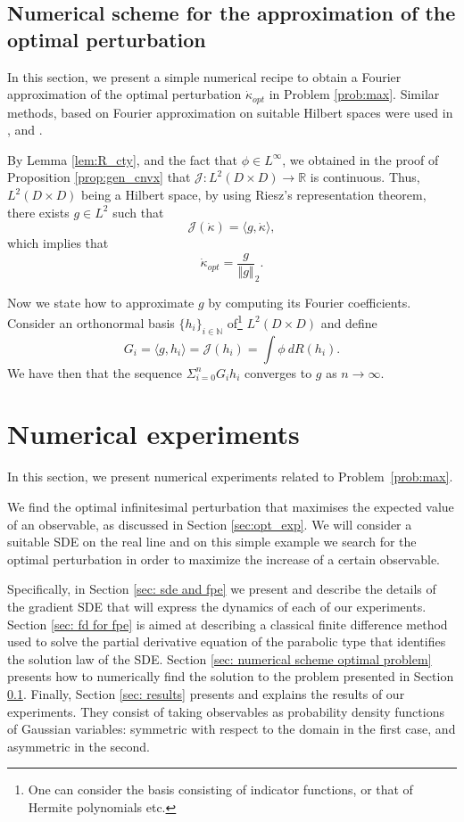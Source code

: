 \documentclass{amsart}
\newcommand\bN{{\mathbb N}}
\newcommand{\norm}[1]{\left\Vert#1\right\Vert}
\begin{document}
\subsection{Numerical scheme for the approximation of the optimal perturbation}
\label{sec: numerical scheme for the approximation of the opt. pertb.}
In this section, we present a simple numerical recipe to obtain a Fourier approximation of the optimal perturbation $\dot{\kappa}_{opt}$ in Problem \ref{prob:max}. Similar methods, based on  Fourier approximation on suitable Hilbert spaces  were used in \cite{FG23}, and \cite{GN25}.
 
 By Lemma \ref{lem:R_cty}, and the fact that $\phi\in L^\infty$, we obtained in the proof of Proposition \ref{prop:gen_cnvx} that $\mathcal J:L^2(D\times D)\to \mathbb{R}$ is continuous. 
 Thus, $L^2(D\times D)$ being a Hilbert space, by  using Riesz's representation theorem, there exists \(g\in L^2\) such that 
\[
\mathcal{J}(\dot{\kappa})= \langle g, \dot{\kappa} \rangle,
\]
which implies that 
\[
\dot{\kappa}_{opt}=\frac{g}{\norm{g}}_{2}.
\]

Now we state how to approximate \(g\) by computing its Fourier coefficients. Consider an orthonormal basis
\(\{h_i\}_{i\in \bN}\) of\footnote{One can consider the basis consisting of indicator functions, or that of Hermite polynomials etc.} \(L^2(D\times D)\) and define
\[
G_i = \langle g, h_i \rangle = \mathcal{J}(h_i) = \int \phi~dR(h_i).
\]
 We have then that the sequence \(\Sigma_{i=0}^n G_ih_i\) converges to \(g\) as \(n\to\infty\).\\

\section{Numerical experiments}\label{sec:numerics}
In this section, we present numerical experiments related to Problem~\ref{prob:max}.

We find the optimal infinitesimal perturbation that maximises the expected value of an observable, as discussed in Section \ref{sec:opt_exp}. 
We will consider a suitable SDE on the real line and on this simple example we  search for the optimal perturbation in order to maximize the increase of a certain observable.

Specifically, in Section \ref{sec: sde and fpe} we present and describe the details of the gradient SDE that will express the dynamics of each of our experiments. Section \ref{sec: fd for fpe} is aimed at describing a classical finite difference method used to solve the partial derivative equation of the parabolic type that identifies the solution law of the SDE. Section \ref{sec: numerical scheme optimal problem} presents how to numerically find the solution to the problem presented in Section \ref{sec: numerical scheme for the approximation of the opt. pertb.}. Finally, Section \ref{sec: results} presents and explains the results of our experiments. They consist of taking observables as probability density functions of Gaussian variables: symmetric with respect to the domain in the first case, and asymmetric in the second. 
\end{document}
